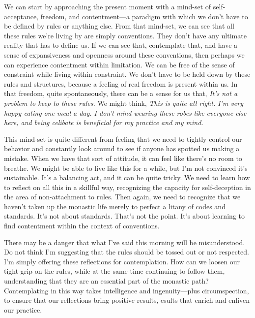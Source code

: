 We can start by approaching the present moment with a mind-set of 
self-acceptance, freedom, and contentment---a paradigm with which we 
don't have to be defined by rules or anything else. From that mind-set, 
we can see that all these rules we're living by are simply conventions. 
They don't have any ultimate reality that has to define us. If we can 
see that, contemplate that, and have a sense of expansiveness and 
openness around these conventions, then perhaps we can experience 
contentment within limitation. We can be free of the sense of 
constraint while living within constraint. We don't have to be held 
down by these rules and structures, because a feeling of real freedom 
is present within us. In that freedom, quite spontaneously, there can 
be a sense for us that, \emph{It's not a problem to keep to these 
rules.} We might think, \emph{This is quite all right. I'm very happy 
eating one meal a day. I don't mind wearing these robes like everyone 
else here, and being celibate is beneficial for my practice and my 
mind.}

This mind-set is quite different from feeling that we need to tightly 
control our behavior and constantly look around to see if anyone has 
spotted us making a mistake. When we have that sort of attitude, it can 
feel like there's no room to breathe. We might be able to live like 
this for a while, but I'm not convinced it's sustainable. It's a 
balancing act, and it can be quite tricky. We need to learn how to 
reflect on all this in a skillful way, recognizing the capacity for 
self-deception in the area of non-attachment to rules. Then again, we 
need to recognize that we haven't taken up the monastic life merely to 
perfect a litany of codes and standards. It's not about standards. 
That's not the point. It's about learning to find contentment within 
the context of conventions.

There may be a danger that what I've said this morning will be 
misunderstood. Do not think I'm suggesting that the rules should be 
tossed out or not respected. I'm simply offering these reflections for 
contemplation. How can we loosen our tight grip on the rules, while at 
the same time continuing to follow them, understanding that they are an 
essential part of the monastic path? Contemplating in this way takes 
intelligence and ingenuity---plus circumspection, to ensure that our 
reflections bring positive results, esults that enrich and enliven our 
practice.


